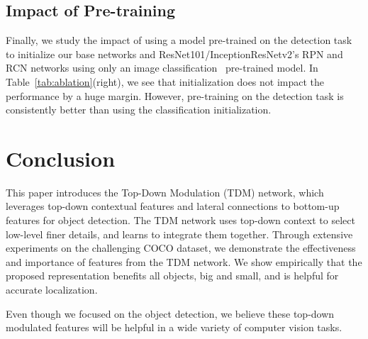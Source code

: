 \documentclass[10pt,twocolumn,letterpaper]{article}
\begin{document}
\subsection{Impact of Pre-training}\label{sec:pretraining} 
Finally, we study the impact of using a model pre-trained on the detection task to initialize our base networks and ResNet101/InceptionResNetv2's RPN and RCN networks \vs using only an image classification~\cite{imagenet} pre-trained model. In Table~\ref{tab:ablation}(right), we see that initialization does not impact the performance by a huge margin. However, pre-training on the detection task is consistently better than using the classification initialization.

\section{Conclusion}
This paper introduces the Top-Down Modulation (TDM) network, which leverages top-down contextual features and lateral connections to bottom-up features for object detection. The TDM network uses top-down context to select low-level finer details, and learns to integrate them together. Through extensive experiments on the challenging COCO dataset, we demonstrate the effectiveness and importance of features from the TDM network. We show empirically that the proposed representation benefits all objects, big and small, and is helpful for accurate localization.

Even though we focused on the object detection, we believe these top-down modulated features will be helpful in a wide variety of computer vision tasks.

{\small


}
\end{document}
